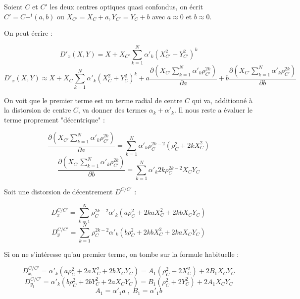 Soient $C$ et $C'$ les deux centres optiques quasi confondus, on \'ecrit  $C'=C-^t(a,b)$
ou  $X_{C'}= X_C+a , Y_{C'}= Y_C+b $ avec $a\approx 0$ et $b\approx 0$.


On peut \'ecrire :

\begin{equation}
   D'_x(X,Y) =  X + X_{C'} \sum _{k=1}^N  \alpha'_k (X_{C'}^2+Y_{C'}^2)^k
\end{equation}
\begin{equation}
   D'_x(X,Y) \approx  X + X_{C} \sum _{k=1}^N  \alpha'_k (X_{C}^2+Y_{C}^2)^k
                + a \frac{\partial(X_{C'} \sum _{k=1}^N  \alpha'_k \rho_{C'}^{2k})} {\partial a}
                + b \frac{\partial(X_{C'} \sum _{k=1}^N  \alpha'_k \rho_{C'}^{2k})} {\partial b}
\end{equation}

On voit que le premier terme est un terme radial de centre $C$ qui va, additionn\'e \`a
la distorsion de centre $C$, va donner des termes $\alpha_k+\alpha'_k$. Il nous reste
a \'evaluer le terme proprement "d\'ecentrique" :


\begin{equation}
   \frac{\partial(X_{C'} \sum _{k=1}^N  \alpha'_k \rho_{C'}^{2k})} {\partial a} 
    = \sum _{k=1}^N  \alpha'_k \rho_{C}^{2k-2}(\rho_C^2 + 2k X_C^2)
\end{equation}
\begin{equation}
   \frac{\partial(X_{C'} \sum _{k=1}^N  \alpha'_k \rho_{C'}^{2k})} {\partial b} 
    = \sum _{k=1}^N  \alpha'_k  2k \rho_{C}^{2k-2} X_C Y_C
\end{equation}


Soit une distorsion de d\'ecentrement $D^{C/C'}$ :

\begin{equation}
   D^{C/C'}_x = \sum _{k=1}^N  \rho_{C}^{2k-2} \alpha'_k(a\rho_C^2 +2k aX_C^2+2k b  X_C Y_C )
   \label{Eq:DecGen:X}
\end{equation}
\begin{equation}
   D^{C/C'}_y = \sum _{k=1}^N  \rho_{C}^{2k-2} \alpha'_k(b\rho_C^2 +2k bX_C^2+2k a  X_C Y_C )
   \label{Eq:DecGen:Y}
\end{equation}

Si on ne s'int\'eresse qu'au premier terme, on tombe sur la formule habituelle :


\begin{equation}
   D^{C/C'}_{x_1} =  \alpha'_k(a\rho_C^2 +2aX_C^2+2 b  X_C Y_C ) = A_1 (\rho_C^2+2X_C^2) + 2 B_1 X_C Y_C
\end{equation}
\begin{equation}
   D^{C/C'}_{y_1} =  \alpha'_k(b\rho_C^2 +2bY_C^2+2 a  X_C Y_C ) = B_1 (\rho_C^2+2Y_C^2) + 2 A_1 X_C Y_C
\end{equation}
\begin{equation}
    A_1=\alpha'_1a  \; , \; B_1=\alpha'_1b
\end{equation}

